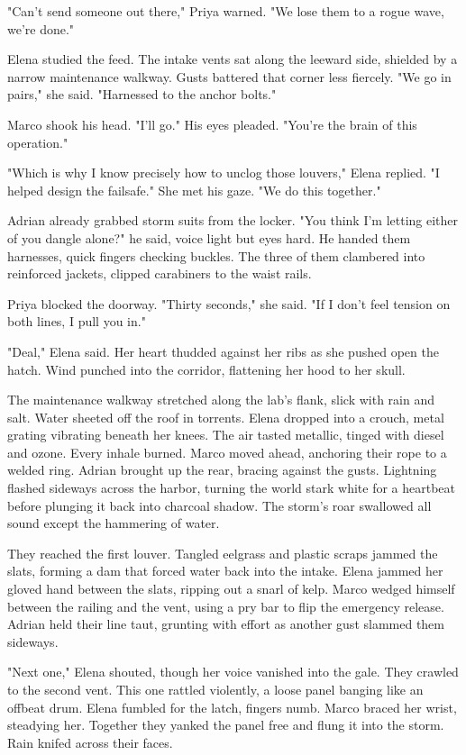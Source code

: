 "Can't send someone out there," Priya warned. "We lose them to a rogue wave, we're done."

Elena studied the feed. The intake vents sat along the leeward side, shielded by a narrow maintenance walkway. Gusts battered that corner less fiercely. "We go in pairs," she said. "Harnessed to the anchor bolts."

Marco shook his head. "I'll go." His eyes pleaded. "You're the brain of this operation."

"Which is why I know precisely how to unclog those louvers," Elena replied. "I helped design the failsafe." She met his gaze. "We do this together."

Adrian already grabbed storm suits from the locker. "You think I'm letting either of you dangle alone?" he said, voice light but eyes hard. He handed them harnesses, quick fingers checking buckles. The three of them clambered into reinforced jackets, clipped carabiners to the waist rails.

Priya blocked the doorway. "Thirty seconds," she said. "If I don't feel tension on both lines, I pull you in."

"Deal," Elena said. Her heart thudded against her ribs as she pushed open the hatch. Wind punched into the corridor, flattening her hood to her skull.

The maintenance walkway stretched along the lab's flank, slick with rain and salt. Water sheeted off the roof in torrents. Elena dropped into a crouch, metal grating vibrating beneath her knees. The air tasted metallic, tinged with diesel and ozone. Every inhale burned. Marco moved ahead, anchoring their rope to a welded ring. Adrian brought up the rear, bracing against the gusts. Lightning flashed sideways across the harbor, turning the world stark white for a heartbeat before plunging it back into charcoal shadow. The storm's roar swallowed all sound except the hammering of water.

They reached the first louver. Tangled eelgrass and plastic scraps jammed the slats, forming a dam that forced water back into the intake. Elena jammed her gloved hand between the slats, ripping out a snarl of kelp. Marco wedged himself between the railing and the vent, using a pry bar to flip the emergency release. Adrian held their line taut, grunting with effort as another gust slammed them sideways.

"Next one," Elena shouted, though her voice vanished into the gale. They crawled to the second vent. This one rattled violently, a loose panel banging like an offbeat drum. Elena fumbled for the latch, fingers numb. Marco braced her wrist, steadying her. Together they yanked the panel free and flung it into the storm. Rain knifed across their faces.

